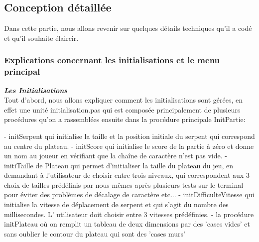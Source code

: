 \documentclass[11pt,a4paper]{article}
\begin{document}
        \begin{algorithm}
        \end{algorithm}
        
       
    \newpage
    
    \subsection{Conception détaillée}
       Dans cette partie, nous allons revenir sur quelques détails techniques qu'il a codé et qu'il souhaite élaircir. 

        \subsubsection{Explications concernant les initialisations et le menu principal}

        \textit{\textbf{Les Initialisations }}\\
       Tout d’abord, nous allons expliquer comment les initialisations sont gérées, en effet une unité initialisation.pas qui est composée principalement de plusieurs procédures qu’on a rassemblées ensuite dans la procédure principale InitPartie: 

 - initSerpent qui initialise la taille et la position initiale du serpent qui correspond au centre du plateau.
 - initScore qui initialise le score de la partie à zéro et donne un nom au joueur en vérifiant que la chaîne de caractère n'est pas vide.
 - initiTaille de Plateau  qui permet d'initialiser la taille du plateau du jeu, en demandant à l'utilisateur de choisir entre trois niveaux, qui correspondent aux 3 choix de tailles prédéfinis par nous-mêmes après plusieurs tests sur le terminal pour éviter des problèmes de décalage de caractère  etc...
 - initDifficulteVitesse qui initialise  la vitesse de déplacement de serpent et qui s’agit du nombre des millisecondes.  L’ utilisateur doit choisir entre 3 vitesses prédéfinies.
  - la procédure initPlateau où on remplit un tableau de deux dimensions par des 'cases vides' et sans oublier le contour du plateau qui sont des 'cases murs' 
\end{document}
